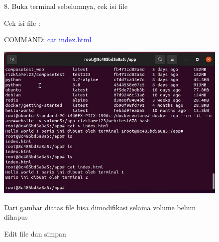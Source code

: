 \begin{figure}
    8. Buka terminal sebelumnya, cek isi file

    Cek isi file :

    COMMAND: \textcolor{Blue}{cat index.html}
        \begin{center}
            \includegraphics[width=\linewidth]{image/70.jpg}
            \caption{Edit file dan simpan}
            \label{fig:my_figure}
        \end{center}
    
    Dari gambar diatas file bisa dimodifikasi selama volume belum dihapus 
\end{figure}

